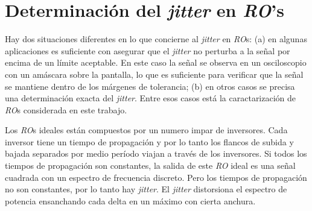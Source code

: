\section{Determinación del \textit{jitter} en \emph{RO}'s}
\label{sec:jitter}

Hay dos situaciones diferentes en lo que concierne al \textit{jitter} en \textit{RO}s:
(a) en algunas aplicaciones es suficiente con asegurar que el \textit{jitter} no perturba a la señal por encima de un límite aceptable.
En este caso la señal se observa en un osciloscopio con un amáscara sobre la pantalla, lo que es suficiente para verificar que la señal se mantiene dentro de los márgenes de tolerancia;
(b) en otros casos se precisa una determinación exacta del \textit{jitter}.
Entre esos casos está la caractarización de \textit{RO}s considerada en este trabajo.

Los \textit{RO}s ideales están compuestos por un numero impar de inversores.
Cada inversor tiene un tiempo de propagación y por lo tanto los flancos de subida y bajada separados por medio período viajan a través de los inversores.
Si todos los tiempos de propagación son constantes, la salida de este \textit{RO} ideal es una señal cuadrada con un espectro de frecuencia discreto.
Pero los tiempos de propagación no son constantes, por lo tanto hay \textit{jitter}.
El \textit{jitter} distorsiona el espectro de potencia ensanchando cada delta en un máximo con cierta anchura.

